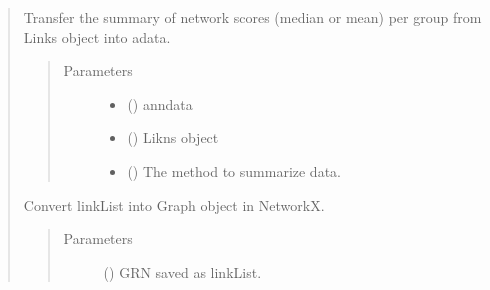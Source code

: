 \documentclass[letterpaper,10pt,english]{sphinxmanual}
\begin{document}
\begin{quote}
\begin{fulllineitems}
\label{\detokenize{modules/celloracle.network_analysis:celloracle.network_analysis.transfer_scores_from_links_to_adata}}
Transfer the summary of network scores (median or mean) per group from Links object into adata.
\begin{quote}\begin{description}
\item[{Parameters}] \leavevmode\begin{itemize}
\item {} 
 () \textendash{} anndata

\item {} 
 ({\hyperref[\detokenize{modules/celloracle:celloracle.Links}]{}}) \textendash{} Likns object

\item {} 
 () \textendash{} The method to summarize data.

\end{itemize}

\end{description}\end{quote}

\end{fulllineitems}


\begin{fulllineitems}
\label{\detokenize{modules/celloracle.network_analysis:celloracle.network_analysis.linkList_to_networkgraph}}
Convert linkList into Graph object in NetworkX.
\begin{quote}\begin{description}
\item[{Parameters}] \leavevmode
{} () \textendash{} GRN saved as linkList.


\end{description}
\end{quote}
\end{fulllineitems}
\end{quote}
\end{document}
